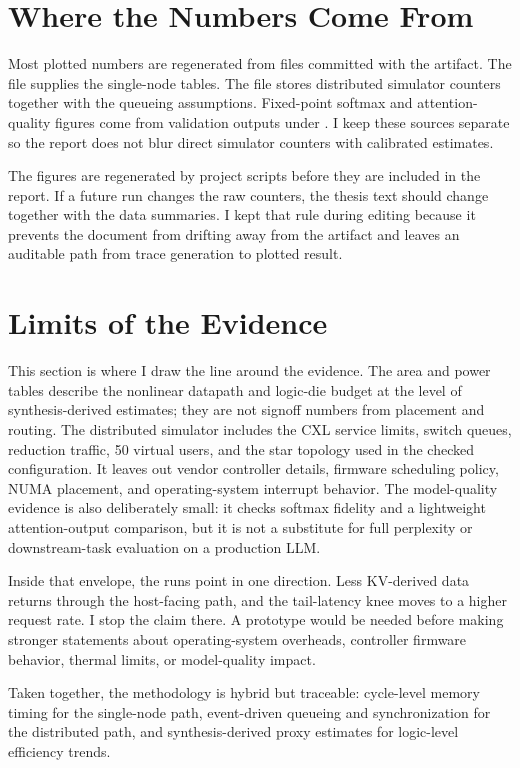 \section{Where the Numbers Come From}

Most plotted numbers are regenerated from files committed with the artifact. The file  supplies the single-node tables. The file  stores distributed simulator counters together with the queueing assumptions. Fixed-point softmax and attention-quality figures come from validation outputs under . I keep these sources separate so the report does not blur direct simulator counters with calibrated estimates.

The figures are regenerated by project scripts before they are included in the report. If a future run changes the raw counters, the thesis text should change together with the data summaries. I kept that rule during editing because it prevents the document from drifting away from the artifact and leaves an auditable path from trace generation to plotted result.

\section{Limits of the Evidence}

This section is where I draw the line around the evidence. The area and power tables describe the nonlinear datapath and logic-die budget at the level of synthesis-derived estimates; they are not signoff numbers from placement and routing. The distributed simulator includes the CXL service limits, switch queues, reduction traffic, 50 virtual users, and the star topology used in the checked configuration. It leaves out vendor controller details, firmware scheduling policy, NUMA placement, and operating-system interrupt behavior. The model-quality evidence is also deliberately small: it checks softmax fidelity and a lightweight attention-output comparison, but it is not a substitute for full perplexity or downstream-task evaluation on a production LLM.

Inside that envelope, the runs point in one direction. Less KV-derived data returns through the host-facing path, and the tail-latency knee moves to a higher request rate. I stop the claim there. A prototype would be needed before making stronger statements about operating-system overheads, controller firmware behavior, thermal limits, or model-quality impact.

Taken together, the methodology is hybrid but traceable: cycle-level memory timing for the single-node path, event-driven queueing and synchronization for the distributed path, and synthesis-derived proxy estimates for logic-level efficiency trends.
